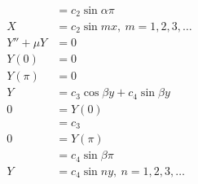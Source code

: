 \documentclass{article}
\begin{document}
\begin{align*}
                                                   & = c_2 \sin \alpha \pi                   \\
  X                                                & = c_2 \sin m x,\ m = 1, 2, 3, \ldots    \\
  Y'' + \mu Y                                      & = 0                                     \\
  Y(0)                                             & = 0                                     \\
  Y(\pi)                                           & = 0                                     \\
  Y                                                & = c_3 \cos \beta y + c_4 \sin \beta y   \\
  0                                                & = Y(0)                                  \\
                                                   & = c_3                                   \\
  0                                                & = Y(\pi)                                \\
                                                   & = c_4 \sin \beta \pi                    \\
  Y                                                & = c_4 \sin n y,\ n = 1, 2, 3, \ldots
\end{align*}
\end{document}
